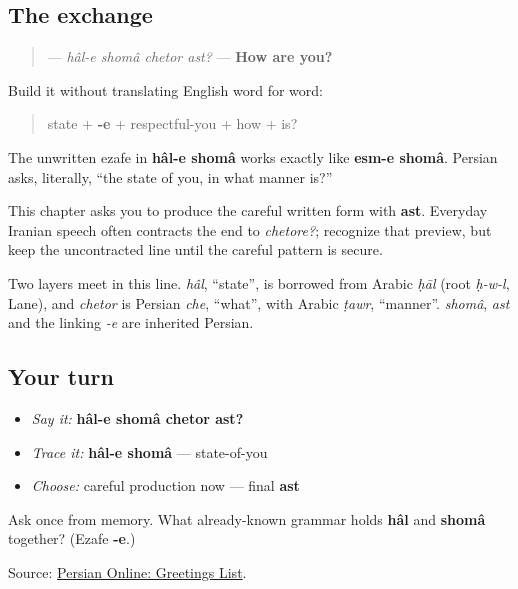 \subsection*{The exchange}
\begin{quote}
\textbf{   } — \emph{hâl-e shomâ chetor ast?} — \textbf{How are you?}
\end{quote}

Build it without translating English word for word:

\begin{quote}
state + \textbf{-e} + respectful-you + how + is?
\end{quote}

The unwritten ezafe in \textbf{hâl-e shomâ} works exactly like \textbf{esm-e shomâ}. Persian asks, literally, “the state of you, in what manner is?”

\begin{grammarlens}[title={Grammar Lens: one reliable careful form}]
This chapter asks you to produce the careful written form with \textbf{ast}. Everyday Iranian speech often contracts the end to \emph{chetore?}; recognize that preview, but keep the uncontracted line until the careful pattern is secure.
\end{grammarlens}

\begin{cousinweb}
Two layers meet in this line. \emph{hâl}, \textquotedblleft{}state\textquotedblright{}, is borrowed from Arabic \emph{ḥāl} (root \emph{ḥ-w-l}, Lane), and \emph{chetor} is Persian \emph{che}, \textquotedblleft{}what\textquotedblright{}, with Arabic \emph{ṭawr}, \textquotedblleft{}manner\textquotedblright{}. \emph{shomâ}, \emph{ast} and the linking \emph{-e} are inherited Persian.
\end{cousinweb}

\subsection*{Your turn}
\begin{itemize}
\raggedright
  \item \emph{Say it:} \textbf{hâl-e shomâ chetor ast?}
  \item \emph{Trace it:} \textbf{hâl-e shomâ} — state-of-you
  \item \emph{Choose:} careful production now — final \textbf{ast}
\end{itemize}

\begin{tcolorbox}[breakable,colback=teal!4,colframe=teal!35!black,title={Before you move on}]
Ask once from memory. What already-known grammar holds \textbf{hâl} and \textbf{shomâ} together? (Ezafe \textbf{-e}.)

Source: \href{https://sites.la.utexas.edu/persian\_online\_resources/vocabulary-lists/meetings-introductions/}{Persian Online: Greetings List}.
\end{tcolorbox}

